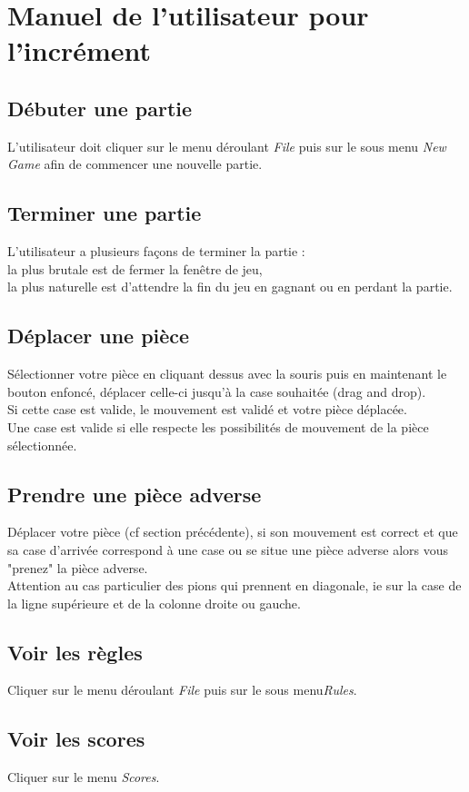 \documentclass[11pt,a4paper]{report}
\begin{document}
\chapter*{Manuel de l'utilisateur pour l'incrément}

\section*{Débuter une partie}
L'utilisateur doit cliquer sur le menu déroulant {\it File} puis sur le sous menu {\it New Game} afin de commencer une nouvelle partie.
\section*{Terminer une partie}
L'utilisateur a plusieurs façons de terminer la partie :
\\la plus brutale est de fermer la fenêtre de jeu, 
\\ la plus naturelle est d'attendre la fin du jeu en gagnant ou en perdant la partie. 
\section*{Déplacer une pièce}
Sélectionner votre pièce en cliquant dessus avec la souris puis en maintenant le bouton enfoncé, déplacer celle-ci jusqu'à la case souhaitée (drag and drop).
\\Si cette case est valide, le mouvement est validé et votre pièce déplacée.
\\Une case est valide si elle respecte les possibilités de mouvement de la pièce sélectionnée.
\section*{Prendre une pièce adverse}
Déplacer votre pièce (cf section précédente), si son mouvement est correct et que sa case d'arrivée correspond à une case ou se situe une pièce adverse alors vous "prenez" la pièce adverse.
\\ Attention au cas particulier des pions qui prennent en diagonale, ie sur la case de la ligne supérieure et de la colonne droite ou gauche.
\section*{Voir les règles}
Cliquer sur le menu déroulant {\it File} puis sur le sous menu{\it Rules}.
\section*{Voir les scores}
Cliquer sur le menu {\it Scores}.
\end{document}

